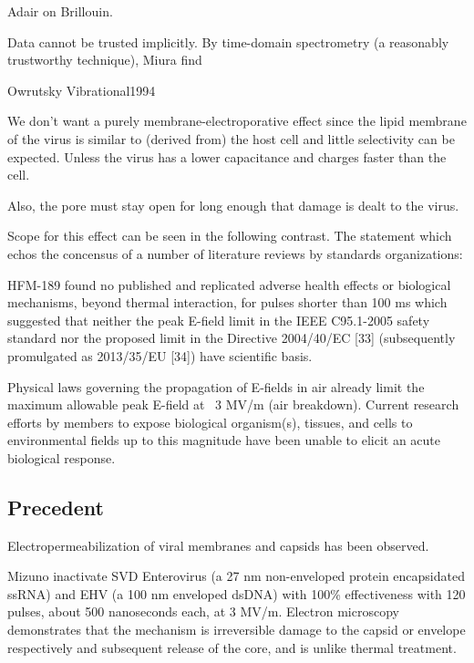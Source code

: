 \documentclass[paper.tex]{subfiles}
\begin{document}
\begin{multicols}{1}
Adair \cite{Biophysics2000} on Brillouin.


Data cannot be trusted implicitly. By time-domain spectrometry (a reasonably trustworthy technique), Miura \cite{Microwave1994} find 


Owrutsky Vibrational1994




We don't want a purely membrane-electroporative effect since the lipid membrane of the virus is similar to (derived from) the host cell and little selectivity can be expected. Unless the virus has a lower capacitance and charges faster than the cell.

Also, the pore must stay open for long enough that damage is dealt to the virus. 



Scope for this effect can be seen in the following contrast. The statement which echos the concensus of a number of literature reviews by standards organizations:

\begin{fquote}
	HFM-189 found no published and replicated adverse health effects or biological mechanisms, beyond
	thermal interaction, for pulses shorter than 100 ms which suggested that neither the peak E-field limit in the
	IEEE C95.1-2005 safety standard {} nor the proposed limit in the Directive 2004/40/EC [33] (subsequently promulgated as 2013/35/EU [34]) have scientific basis. 
	
	Physical laws governing the propagation of E-fields in air already limit the maximum allowable peak E-field at ~3 MV/m (air breakdown). Current research efforts by members to expose biological organism(s), tissues, and cells to environmental
	fields up to this magnitude have been unable to elicit an acute biological response.
\end{fquote}

\subsection{Precedent}

Electropermeabilization of viral membranes and capsids has been observed.

Mizuno \cite{Inactivation1990} inactivate SVD Enterovirus (a 27 nm non-enveloped protein encapsidated ssRNA) and EHV (a 100 nm enveloped dsDNA) with 100\% effectiveness with 120 pulses, about 500 nanoseconds each, at 3 MV/m. Electron microscopy demonstrates that the mechanism is irreversible damage to the capsid or envelope respectively and subsequent release of the core, and is unlike thermal treatment.


\end{multicols}
\end{document}
